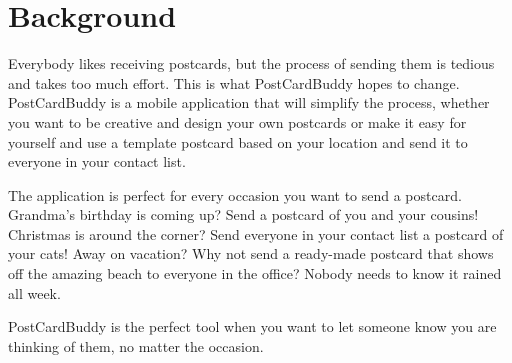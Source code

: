\documentclass[10pt,a4paper]{article}
\begin{document}
\section{Background}
Everybody likes receiving postcards, but the process of sending them is tedious and takes too much effort. This is what PostCardBuddy hopes to change. PostCardBuddy is a mobile application that will simplify the process, whether you want to be creative and design your own postcards or make it easy for yourself and use a template postcard based on your location and send it to everyone in your contact list. 

The application is perfect for every occasion you want to send a postcard. Grandma's birthday is coming up? Send a postcard of you and your cousins! Christmas is around the corner? Send everyone in your contact list a postcard of your cats! Away on vacation? Why not send a ready-made postcard that shows off the amazing beach to everyone in the office? Nobody needs to know it rained all week. 

PostCardBuddy is the perfect tool when you want to let someone know you are thinking of them, no matter the occasion.


\end{document}
